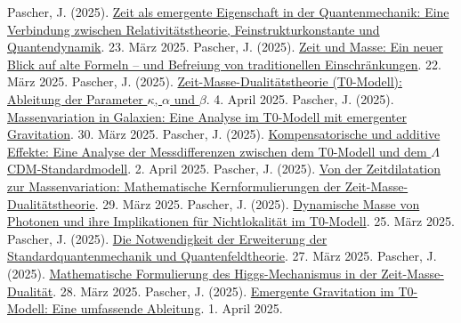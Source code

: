 \documentclass[a4paper,12pt]{article}
\begin{document}
	\begin{thebibliography}{99}
		 Pascher, J. (2025). \href{https://github.com/jpascher/T0-Time-Mass-Duality/tree/main/2/pdf/Deutsch/ZeitEmergentQM.pdf}{Zeit als emergente Eigenschaft in der Quantenmechanik: Eine Verbindung zwischen Relativitätstheorie, Feinstrukturkonstante und Quantendynamik}. 23. März 2025.
		 Pascher, J. (2025). \href{https://github.com/jpascher/T0-Time-Mass-Duality/tree/main/2/pdf/Deutsch/ZeitMasseNeuerBlick.pdf}{Zeit und Masse: Ein neuer Blick auf alte Formeln – und Befreiung von traditionellen Einschränkungen}. 22. März 2025.
		 Pascher, J. (2025). \href{https://github.com/jpascher/T0-Time-Mass-Duality/tree/main/2/pdf/Deutsch/ZeitMasseT0Params.pdf}{Zeit-Masse-Dualitätstheorie (T0-Modell): Ableitung der Parameter \(\kappa\), \(\alpha\) und \(\beta\)}. 4. April 2025.
		 Pascher, J. (2025). \href{https://github.com/jpascher/T0-Time-Mass-Duality/tree/main/2/pdf/Deutsch/MassVarGalaxien.pdf}{Massenvariation in Galaxien: Eine Analyse im T0-Modell mit emergenter Gravitation}. 30. März 2025.
		 Pascher, J. (2025). \href{https://github.com/jpascher/T0-Time-Mass-Duality/tree/main/2/pdf/Deutsch/MessdifferenzenT0Standard.pdf}{Kompensatorische und additive Effekte: Eine Analyse der Messdifferenzen zwischen dem T0-Modell und dem \(\Lambda\)CDM-Standardmodell}. 2. April 2025.
		 Pascher, J. (2025). \href{https://github.com/jpascher/T0-Time-Mass-Duality/tree/main/2/pdf/Deutsch/MathZeitMasseLagrange.pdf}{Von der Zeitdilatation zur Massenvariation: Mathematische Kernformulierungen der Zeit-Masse-Dualitätstheorie}. 29. März 2025.
		 Pascher, J. (2025). \href{https://github.com/jpascher/T0-Time-Mass-Duality/tree/main/2/pdf/Deutsch/DynMassePhotonenNichtlokal.pdf}{Dynamische Masse von Photonen und ihre Implikationen für Nichtlokalität im T0-Modell}. 25. März 2025.
		 Pascher, J. (2025). \href{https://github.com/jpascher/T0-Time-Mass-Duality/tree/main/2/pdf/Deutsch/NotwendigkeitQMErweiterung.pdf}{Die Notwendigkeit der Erweiterung der Standardquantenmechanik und Quantenfeldtheorie}. 27. März 2025.
		 Pascher, J. (2025). \href{https://github.com/jpascher/T0-Time-Mass-Duality/tree/main/2/pdf/Deutsch/MathHiggsZeitMasse.pdf}{Mathematische Formulierung des Higgs-Mechanismus in der Zeit-Masse-Dualität}. 28. März 2025.
		 Pascher, J. (2025). \href{https://github.com/jpascher/T0-Time-Mass-Duality/tree/main/2/pdf/Deutsch/EmergentGravT0.pdf}{Emergente Gravitation im T0-Modell: Eine umfassende Ableitung}. 1. April 2025.

\end{thebibliography}
\end{document}
